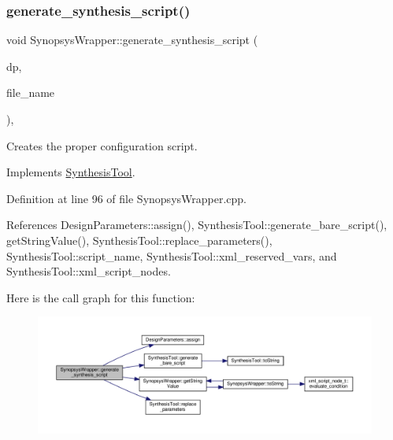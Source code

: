 \subsubsection{\texorpdfstring{generate\+\_\+synthesis\+\_\+script()}{generate\_synthesis\_script()}}
{\footnotesize\ttfamily void Synopsys\+Wrapper\+::generate\+\_\+synthesis\+\_\+script (\begin{DoxyParamCaption}\item[{const \hyperlink{DesignParameters_8hpp_ae36bb1c4c9150d0eeecfe1f96f42d157}{Design\+Parameters\+Ref} \&}]{dp,  }\item[{const std\+::string \&}]{file\+\_\+name }\end{DoxyParamCaption})\hspace{0.3cm}{\ttfamily [override]}, {\ttfamily [virtual]}}



Creates the proper configuration script. 



Implements \hyperlink{classSynthesisTool_ad62c7c8ec82a58b62ee6ca5325ae8e69}{Synthesis\+Tool}.



Definition at line 96 of file Synopsys\+Wrapper.\+cpp.



References Design\+Parameters\+::assign(), Synthesis\+Tool\+::generate\+\_\+bare\+\_\+script(), get\+String\+Value(), Synthesis\+Tool\+::replace\+\_\+parameters(), Synthesis\+Tool\+::script\+\_\+name, Synthesis\+Tool\+::xml\+\_\+reserved\+\_\+vars, and Synthesis\+Tool\+::xml\+\_\+script\+\_\+nodes.

Here is the call graph for this function\+:
\nopagebreak
\begin{figure}[H]
\begin{center}
\leavevmode
\includegraphics[width=350pt]{d7/d59/classSynopsysWrapper_a9f8b574d1d4e788b6e2bcde029a3d8fd_cgraph}
\end{center}
\end{figure}
\mbox{\label{classSynopsysWrapper_a4d08b4d2ce868e213182fcd405022023}} 
